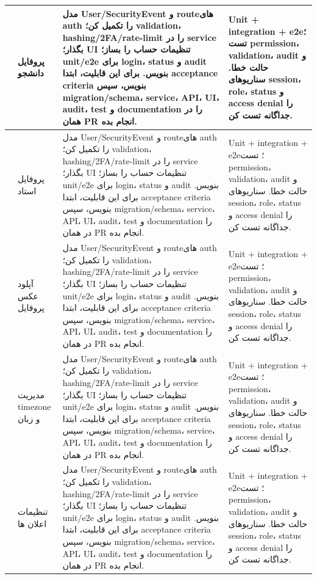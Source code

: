 \documentclass[11pt,a4paper]{article}
\begin{document}
\begin{longtable}{|>{\raggedleft\arraybackslash}p{}|>{\raggedleft\arraybackslash}p{}|>{\raggedleft\arraybackslash}p{}|>{\raggedleft\arraybackslash}p{}|}
15 & پروفایل دانشجو & مدل User/SecurityEvent و routeهای auth را تکمیل کن؛ validation، hashing/2FA/rate-limit را در service بگذار؛ UI تنظیمات حساب را بساز؛ unit/e2e برای login، status و audit بنویس. برای این قابلیت، ابتدا acceptance criteria بنویس، سپس migration/schema، service، API، UI، audit، test و documentation را در همان PR انجام بده. & Unit + integration + e2e؛ تست permission، validation، audit و حالت خطا. سناریوهای session، role، status و access denial را جداگانه تست کن. \\ \hline
16 & پروفایل استاد & مدل User/SecurityEvent و routeهای auth را تکمیل کن؛ validation، hashing/2FA/rate-limit را در service بگذار؛ UI تنظیمات حساب را بساز؛ unit/e2e برای login، status و audit بنویس. برای این قابلیت، ابتدا acceptance criteria بنویس، سپس migration/schema، service، API، UI، audit، test و documentation را در همان PR انجام بده. & Unit + integration + e2e؛ تست permission، validation، audit و حالت خطا. سناریوهای session، role، status و access denial را جداگانه تست کن. \\ \hline
17 & آپلود عکس پروفایل & مدل User/SecurityEvent و routeهای auth را تکمیل کن؛ validation، hashing/2FA/rate-limit را در service بگذار؛ UI تنظیمات حساب را بساز؛ unit/e2e برای login، status و audit بنویس. برای این قابلیت، ابتدا acceptance criteria بنویس، سپس migration/schema، service، API، UI، audit، test و documentation را در همان PR انجام بده. & Unit + integration + e2e؛ تست permission، validation، audit و حالت خطا. سناریوهای session، role، status و access denial را جداگانه تست کن. \\ \hline
18 & مدیریت timezone و زبان & مدل User/SecurityEvent و routeهای auth را تکمیل کن؛ validation، hashing/2FA/rate-limit را در service بگذار؛ UI تنظیمات حساب را بساز؛ unit/e2e برای login، status و audit بنویس. برای این قابلیت، ابتدا acceptance criteria بنویس، سپس migration/schema، service، API، UI، audit، test و documentation را در همان PR انجام بده. & Unit + integration + e2e؛ تست permission، validation، audit و حالت خطا. سناریوهای session، role، status و access denial را جداگانه تست کن. \\ \hline
19 & تنظیمات اعلان ها & مدل User/SecurityEvent و routeهای auth را تکمیل کن؛ validation، hashing/2FA/rate-limit را در service بگذار؛ UI تنظیمات حساب را بساز؛ unit/e2e برای login، status و audit بنویس. برای این قابلیت، ابتدا acceptance criteria بنویس، سپس migration/schema، service، API، UI، audit، test و documentation را در همان PR انجام بده. & Unit + integration + e2e؛ تست permission، validation، audit و حالت خطا. سناریوهای session، role، status و access denial را جداگانه تست کن. \\ \hline

\end{longtable}
\end{document}
